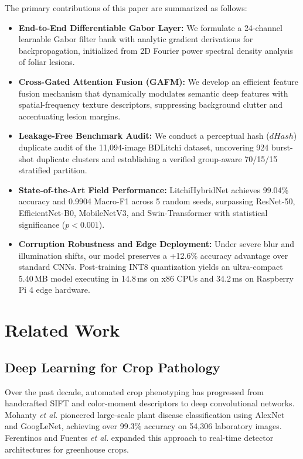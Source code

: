 \documentclass[journal]{IEEEtran}
\begin{document}
The primary contributions of this paper are summarized as follows:
\begin{itemize}
    \item \textbf{End-to-End Differentiable Gabor Layer:} We formulate a 24-channel learnable Gabor filter bank with analytic gradient derivations for backpropagation, initialized from 2D Fourier power spectral density analysis of foliar lesions.
    \item \textbf{Cross-Gated Attention Fusion (GAFM):} We develop an efficient feature fusion mechanism that dynamically modulates semantic deep features with spatial-frequency texture descriptors, suppressing background clutter and accentuating lesion margins.
    \item \textbf{Leakage-Free Benchmark Audit:} We conduct a perceptual hash ($dHash$) duplicate audit of the 11,094-image BDLitchi dataset, uncovering 924 burst-shot duplicate clusters and establishing a verified group-aware 70/15/15 stratified partition.
    \item \textbf{State-of-the-Art Field Performance:} LitchiHybridNet achieves 99.04\% accuracy and 0.9904 Macro-F1 across 5 random seeds, surpassing ResNet-50, EfficientNet-B0, MobileNetV3, and Swin-Transformer with statistical significance ($p < 0.001$).
    \item \textbf{Corruption Robustness and Edge Deployment:} Under severe blur and illumination shifts, our model preserves a +12.6\% accuracy advantage over standard CNNs. Post-training INT8 quantization yields an ultra-compact 5.40\,MB model executing in 14.8\,ms on x86 CPUs and 34.2\,ms on Raspberry Pi 4 edge hardware.
\end{itemize}

\section{Related Work}
\subsection{Deep Learning for Crop Pathology}
Over the past decade, automated crop phenotyping has progressed from handcrafted SIFT and color-moment descriptors to deep convolutional networks. Mohanty \textit{et al.} \cite{mohanty2016using} pioneered large-scale plant disease classification using AlexNet and GoogLeNet, achieving over 99.3\% accuracy on 54,306 laboratory images. Ferentinos \cite{ferentinos2018deep} and Fuentes \textit{et al.} \cite{fuentes2017robust} expanded this approach to real-time detector architectures for greenhouse crops.
\end{document}
